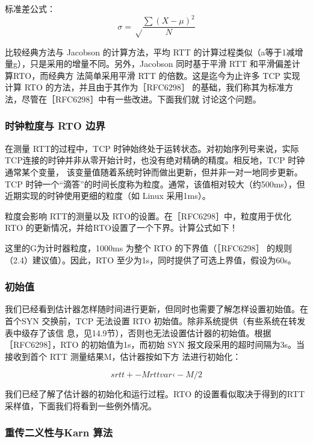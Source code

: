\begin{tcolorbox}
    标准差公式：
    \begin{equation}
        \sigma = \sqrt\frac{\sum{(X-\mu)^2}}{N}
    \end{equation}
\end{tcolorbox}
比较经典方法与 Jacobson 的计算方法，平均 RTT 的计算过程类似（a等于1减增量g），只是采用的增量不同。另外，Jacobson 同时基于平滑 RTT 和平滑偏差计算RTO，而经典方
法简单采用平滑 RTT 的倍数。这是迄今为止许多 TCP 实现计算 RTO 的方法，并且由于其作为［RFC6298］ 的基础，我们称其为标准方法，尽管在［RFC6298］中有一些改进。下面我们就
讨论这个问题。

\subsubsection{时钟粒度与 RTO 边界}

在测量 RTT的过程中，TCP 时钟始终处于运转状态。对初始序列号来说，实际TCP连接的时钟并非从零开始计时，也没有绝对精确的精度。相反地，TCP 时钟通常某个变量，
该变量值随着系统时钟而做出更新，但并非一对一地同步更新。TCP 时钟一个“滴答”的时间长度称为粒度。通常，该值相对较大（约500ms），但近期实现的时钟使用更细的粒度（如
Linux 采用1ms）。

粒度会影响 RTT的测量以及 RTO的设置。在［RFC6298］中，粒度用于优化 RTO 的更新情况，并给RTO设置了一个下界。计算公式如下！

这里的G为计时器粒度，1000ms 为整个 RTO 的下界值（［RFC6298］ 的规则（2.4）建议值）。因此，RTO 至少为1s，同时提供了可选上界值，假设为60s。

\subsubsection{初始值}

我们已经看到估计器怎样随时间进行更新，但同时也需要了解怎样设置初始值。在首个SYN 交换前，TCP 无法设置 RTO 初始值。除非系统提供（有些系统在转发表中级存了该信
息，见14.9节），否则也无法设置估计器的初始值。根据［RFC6298］，RTO 的初始值为1s，而初始 SYN 报文段采用的超时间隔为3s。当接收到首个 RTT 测量结果M，估计器按如下方
法进行初始化：

\begin{equation}
    srtt +- M
    rttvar ‹- M/2
\end{equation}

我们已经了解了估计器的初始化和运行过程。RTO 的设置看似取决于得到的RTT采样值，下面我们将看到一些例外情况。
\subsubsection{重传二义性与Karn 算法}

